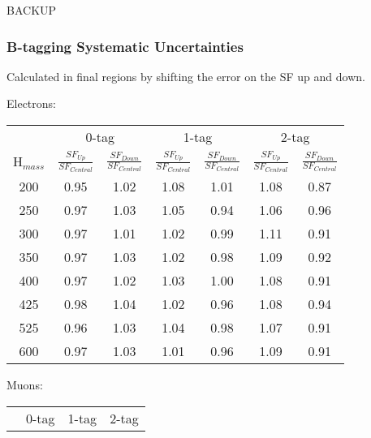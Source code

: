 \documentclass{beamer}
\begin{document}
\begin{frame}
\begin{center}
\huge
BACKUP
\end{center}
\end{frame}


\begin{frame}
  \frametitle{B-tagging Systematic Uncertainties}

Calculated in final regions by shifting the error on the SF up and down.

\vspace{0.2cm}
\begin{center}
{\tiny
Electrons:

\begin{tabular}{c|c|c|c|c|c|c}
\hline
\hline
          & \multicolumn{2}{|c|}{0-tag} &  \multicolumn{2}{|c}{1-tag} &
          \multicolumn{2}{|c}{2-tag} \\

H$_{mass}$ & $\frac{SF_{Up}}{SF_{Central}}$  &
$\frac{SF_{Down}}{SF_{Central}}$ & $\frac{SF_{Up}}{SF_{Central}}$   &
$\frac{SF_{Down}}{SF_{Central}}$ & $\frac{SF_{Up}}{SF_{Central}}$   & $\frac{SF_{Down}}{SF_{Central}}$  \\
\hline
200    &  0.95 & 1.02 & 1.08 & 1.01 &1.08&0.87\\
250    &  0.97 & 1.03 & 1.05 & 0.94 &1.06&0.96\\
300    &  0.97 & 1.01 & 1.02 & 0.99 &1.11&0.91\\
350    &  0.97 & 1.03 & 1.02 & 0.98 &1.09&0.92\\
400    &  0.97 & 1.02 & 1.03 & 1.00 &1.08&0.91\\
425    &  0.98 & 1.04 & 1.02 & 0.96 &1.08&0.94\\
525    &  0.96 & 1.03 & 1.04 & 0.98 &1.07&0.91\\
600    &  0.97 & 1.03 & 1.01 & 0.96 &1.09&0.91\\
\hline
\hline
\end{tabular}

\vspace{0.5cm}


Muons:

\begin{tabular}{c|c|c|c|c|c|c}
\hline
\hline
          & \multicolumn{2}{|c|}{0-tag} &  \multicolumn{2}{|c}{1-tag} &
          \multicolumn{2}{|c}{2-tag} \\


\end{tabular}}
\end{center}
\end{frame}
\end{document}
